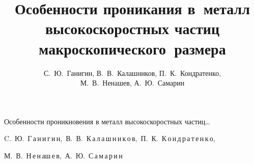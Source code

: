 
%

% 


% 



\renewcommand{\baselinestretch}{0.85}

%




\renewcommand{\firstpage}{136}

\renewcommand{\lastpage}{146}












\title{Особенности проникания в~металл высокоскоростных частиц макроскопического~размера}%

{Особенности проникновения в металл высокоскоростных частиц\dots}



\author{С.~Ю.~Ганигин, В.~В.~Калашников, П.~К.~Кондратенко, \\ М.~В.~Ненашев, А.~Ю.~Самарин}%

{C.~Ю.~Г\,а\,н\,и\,г\,и\,н,\ В.~В.~К\,а\,л\,а\,ш\,н\,и\,к\,о\,в,\ П.~К.~К\,о\,н\,д\,р\,а\,т\,е\,н\,к\,о,\ 

М.~В.~Н\,е\,н\,а\-ш\,е\,в,\ А.~Ю.~С\,а\,м\,а\,р\,и\,н}%














